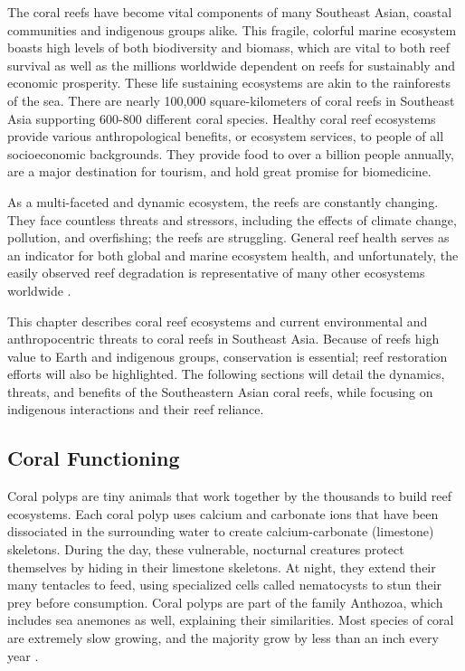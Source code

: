 \documentclass{book}\usepackage{knitr}
\begin{document}
\begin{knitrout}
\begin{kframe}
The coral reefs have become vital components of many Southeast Asian, coastal communities and indigenous groups alike. This fragile, colorful marine ecosystem boasts high levels of both biodiversity and biomass, which are vital to both reef survival as well as the millions worldwide dependent on reefs for sustainably and economic prosperity. These life sustaining ecosystems are akin to the rainforests of the sea. There are nearly 100,000 square-kilometers of coral reefs in Southeast Asia supporting 600-800 different coral species. Healthy coral reef ecosystems provide various anthropological benefits, or ecosystem services, to people of all socioeconomic backgrounds. They provide food to over a billion people annually, are a major destination for tourism, and hold great promise for biomedicine. 

As a multi-faceted and dynamic ecosystem, the reefs are constantly changing. They face countless threats and stressors, including the effects of climate change, pollution, and overfishing; the reefs are struggling. General reef health serves as an indicator for both global and marine ecosystem health, and unfortunately, the easily observed reef degradation is representative of many other ecosystems worldwide \citep{RAR}.

This chapter describes coral reef ecosystems and current environmental and anthropocentric threats to coral reefs in Southeast Asia.  Because of reefs high value to Earth and indigenous groups, conservation is essential; reef restoration efforts will also be highlighted. The following sections will detail the dynamics, threats, and benefits of the Southeastern Asian coral reefs, while focusing on indigenous interactions and their reef reliance.

\subsection{Coral Functioning}

Coral polyps are tiny animals that work together by the thousands to build reef ecosystems. Each coral polyp uses calcium and carbonate ions that have been dissociated in the surrounding water to create calcium-carbonate (limestone) skeletons. During the day, these vulnerable, nocturnal creatures protect themselves by hiding in their limestone skeletons. At night, they extend their many tentacles to feed, using specialized cells called nematocysts to stun their prey before consumption. Coral polyps are part of the family Anthozoa, which includes sea anemones as well, explaining their similarities. Most species of coral are extremely slow growing, and the majority grow by less than an inch every year \citep{coralreefalliance_2021}.


\end{kframe}
\end{knitrout}
\end{document}
